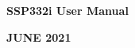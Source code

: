 \documentclass[12pt,a4paper]{report}
\begin{document}
\thispagestyle{logo}
\begin{center}

\vspace{20mm}
\textbf{}
\vspace{5mm}
\\
\textbf{}
\vspace{5mm}
\vspace{5mm}
\\ {\large{\textbf{ SSP332i User Manual}}} 
\\{\textbf{}}
\vspace{20mm}
\vspace{10mm}
\vspace{10mm}
\end{center}
\vspace{105mm}
\hspace{60mm}
\textbf{JUNE 2021}



   \newpage




\end{document}
